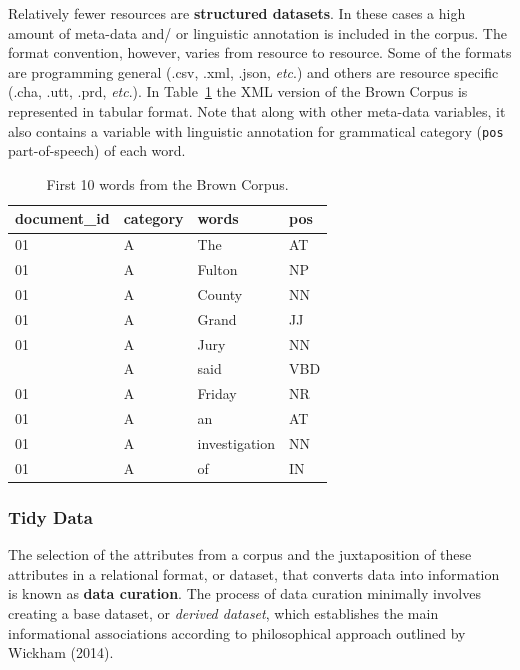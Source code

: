\documentclass[
  letterpaper,
]{latex/krantz}
\begin{document}
Relatively fewer resources are \textbf{structured datasets}. In these
cases a high amount of meta-data and/ or linguistic annotation is
included in the corpus. The format convention, however, varies from
resource to resource. Some of the formats are programming general (.csv,
.xml, .json, \emph{etc}.) and others are resource specific (.cha, .utt,
.prd, \emph{etc}.). In Table~\ref{tbl-structure-brown} the XML version
of the Brown Corpus is represented in tabular format. Note that along
with other meta-data variables, it also contains a variable with
linguistic annotation for grammatical category (\texttt{pos}
part-of-speech) of each word.

\hypertarget{tbl-structure-brown}{}
\begin{table}
\caption{\label{tbl-structure-brown}First 10 words from the Brown Corpus. }\tabularnewline

\centering
\begin{tabular}{llll}
\toprule
document\_id & category & words & pos\\
\midrule
01 & A & The & AT\\
01 & A & Fulton & NP\\
01 & A & County & NN\\
01 & A & Grand & JJ\\
01 & A & Jury & NN\\
\addlinespace
01 & A & said & VBD\\
01 & A & Friday & NR\\
01 & A & an & AT\\
01 & A & investigation & NN\\
01 & A & of & IN\\
\bottomrule
\end{tabular}
\end{table}

\hypertarget{ud-tidy-data}{%
\subsubsection{Tidy Data}\label{ud-tidy-data}}

The selection of the attributes from a corpus and the juxtaposition of
these attributes in a relational format, or dataset, that converts data
into information is known as \textbf{data curation}. The process of data
curation minimally involves creating a base dataset, or \emph{derived
dataset}, which establishes the main informational associations
according to philosophical approach outlined by Wickham (2014).
\end{document}
